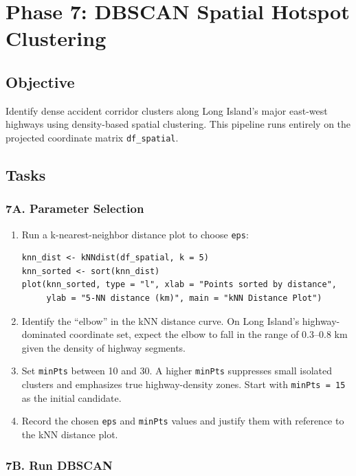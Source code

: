 \documentclass[11pt]{article}
\begin{document}
\section{Phase 7: DBSCAN Spatial Hotspot Clustering}

\subsection{Objective}

Identify dense accident corridor clusters along Long Island's major east-west highways using density-based spatial clustering. This pipeline runs entirely on the projected coordinate matrix \texttt{df\_spatial}.

\subsection{Tasks}

\subsubsection*{7A. Parameter Selection}

\begin{enumerate}
  \item Run a k-nearest-neighbor distance plot to choose \texttt{eps}:
  \begin{verbatim}
knn_dist <- kNNdist(df_spatial, k = 5)
knn_sorted <- sort(knn_dist)
plot(knn_sorted, type = "l", xlab = "Points sorted by distance",
     ylab = "5-NN distance (km)", main = "kNN Distance Plot")
  \end{verbatim}

  \item Identify the ``elbow'' in the kNN distance curve. On Long Island's highway-dominated coordinate set, expect the elbow to fall in the range of 0.3--0.8 km given the density of highway segments.

  \item Set \texttt{minPts} between 10 and 30. A higher \texttt{minPts} suppresses small isolated clusters and emphasizes true highway-density zones. Start with \texttt{minPts = 15} as the initial candidate.

  \item Record the chosen \texttt{eps} and \texttt{minPts} values and justify them with reference to the kNN distance plot.
\end{enumerate}

\subsubsection*{7B. Run DBSCAN}
\end{document}
